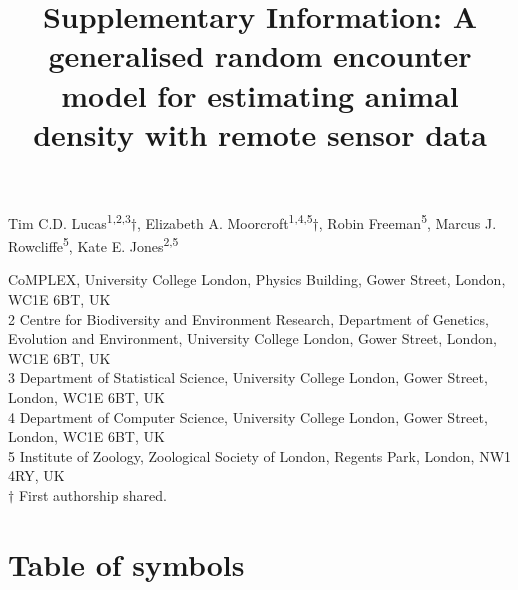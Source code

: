 \documentclass[a4paper,10pt,reqno,oneside]{amsart}
\begin{document}
\title[Supp. Info, Lucas \emph{et al.}: A generalised random encounter model for animals]{Supplementary Information: A generalised random encounter model for estimating animal density with remote sensor data}
\maketitle


%

\noindent Tim C.D. Lucas\textsuperscript{1,2,3}$\dagger$, Elizabeth A. Moorcroft\textsuperscript{1,4,5}$\dagger$, Robin Freeman\textsuperscript{5}, Marcus J. Rowcliffe\textsuperscript{5}, Kate E. Jones\textsuperscript{2,5}\\



 CoMPLEX, University College London, Physics Building, Gower Street, London, WC1E 6BT, UK\\ 
2 Centre for Biodiversity and Environment Research, Department of Genetics, Evolution and Environment, University College London, Gower Street, London, WC1E 6BT, UK\\ 
3 Department of Statistical Science, University College London, Gower Street, London, WC1E 6BT, UK\\ 
4 Department of Computer Science, University College London, Gower Street, London, WC1E 6BT, UK\\ 
5 Institute of Zoology, Zoological Society of London, Regents Park, London, NW1 4RY, UK\\
$\dagger$ First authorship shared. 


\section{Table of symbols}
\end{document}
